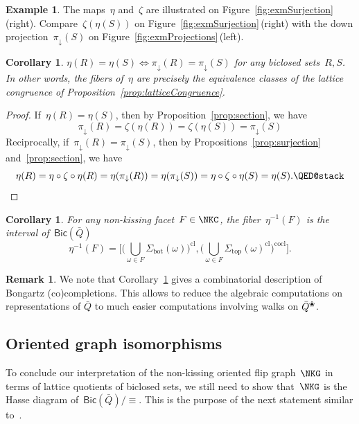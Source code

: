 \documentclass{memo-l}
\newtheorem{corollary}[theorem]{Corollary}
\theoremstyle{definition}
\newtheorem{example}[theorem]{Example}
\newtheorem{remark}[theorem]{Remark}
\newcommand{\fref}[1]{Figure~\ref{#1}} %
\newcommand{\blossom}{^\text{\ding{96}}} %
\renewcommand{\top}{\mathrm{top}} %
\newcommand{\bottom}{\mathrm{bot}} %
\newcommand{\closure}[1]{#1^{\mathrm{cl}}} %
\newcommand{\coclosure}[1]{#1^{\mathrm{cocl}}} %
\newcommand{\Bicl}[1]{\mathsf{Bic}(#1)} %
\newcommand{\projDown}{\pi_\downarrow} %
\begin{document}
\begin{example}
The maps~$\eta$ and~$\zeta$ are illustrated on \fref{fig:exmSurjection}\,(right).
Compare~$\zeta(\eta(S))$ on \fref{fig:exmSurjection}\,(right) with the down projection~$\projDown(S)$ on \fref{fig:exmProjections}\,(left).
\end{example}

\begin{corollary}
\label{coro:fibers}
$\eta(R) = \eta(S) \iff \projDown(R) = \projDown(S)$ for any biclosed sets~$R,S$. In other words, the fibers of~$\eta$ are precisely the equivalence classes of the lattice congruence of Proposition~\ref{prop:latticeCongruence}.
\end{corollary}

\begin{proof}
If~$\eta(R) = \eta(S)$, then by Proposition~\ref{prop:section}, we have
\[
\projDown(R) = \zeta(\eta(R)) = \zeta(\eta(S)) = \projDown(S)
\]
Reciprocally, if~$\projDown(R) = \projDown(S)$, then by Propositions~\ref{prop:surjection} and~\ref{prop:section}, we have
\[
\eta(R) = \eta \circ \zeta \circ \eta(R) = \eta(\projDown(R)) = \eta(\projDown(S)) = \eta \circ \zeta \circ \eta(S) = \eta(S).
\qedhere
\]
\end{proof}

\begin{corollary}\label{cor: interval biclosed}
For any non-kissing facet~$F \in \NKC$, the fiber~$\eta^{-1}(F)$ is the interval of~$\Bicl{\bar Q}$
\[
\eta^{-1}(F) = \bigg[ \closure{ \Big( \bigcup_{\omega \in F} \Sigma_\bottom(\omega) \Big) }, \coclosure{ \Big( \bigcup_{\omega \in F} \closure{\Sigma_\top(\omega)} \Big) } \bigg].
\]
\end{corollary}

\begin{remark}\label{rem: Bongartz}
 We note that Corollary~\ref{cor: interval biclosed} gives a combinatorial description of Bongartz (co)com\-pletions.
 This allows to reduce the algebraic computations on representations of $\bar Q$ to much easier computations involving walks on $\bar Q\blossom$.
\end{remark}


\subsection{Oriented graph isomorphisms}

To conclude our interpretation of the non-kissing oriented flip graph~$\NKG$ in terms of lattice quotients of biclosed sets, we still need to show that~$\NKG$ is the Hasse diagram of~$\Bicl{\bar Q}/{\equiv}$.
This is the purpose of the next statement similar to~\cite[Claim~8.10]{McConville}.
\end{document}
